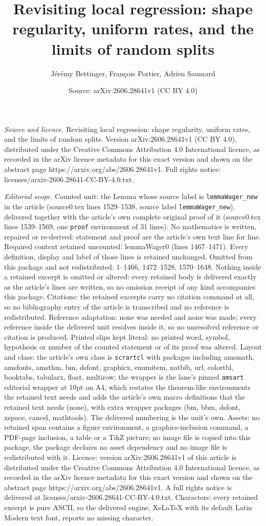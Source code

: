 \documentclass[10pt,a4paper]{amsart}
\title[Revisiting local regression: shape regularity, uniform rates]{Revisiting local regression: shape regularity, uniform rates, and the limits of random splits}
\author{J\'er\'emy Bettinger, Fran\c{c}ois Portier, Adrien Saumard}
\date{Source: arXiv:2606.28641v1 (CC BY 4.0)}
\begin{document}
\maketitle

\noindent\emph{Source and licence.} Revisiting local regression: shape regularity, uniform rates, and the limits of random splits. Version arXiv:2606.28641v1 (CC BY 4.0), distributed under the Creative Commons Attribution 4.0 International licence, as recorded in the arXiv licence metadata for this exact version and shown on the abstract page https://arxiv.org/abs/2606.28641v1. Full rights notice: licenses/arxiv-2606.28641-CC-BY-4.0.txt.\par\smallskip

\noindent\textit{Editorial scope.} Counted unit: the Lemma whose source label is \texttt{lemmaWager\_new} in the article (source0.tex lines 1529--1538, source label \texttt{lemmaWager\_new}), delivered together with the article's own complete original proof of it (source0.tex lines 1539--1569, one \texttt{proof} environment of 31 lines). No mathematics is written, repaired or re-derived: statement and proof are the article's own text line for line. Required context retained uncounted: lemmaWager0 (lines 1467--1471). Every definition, display and label of those lines is retained unchanged. Omitted from this package and not redistributed: 1--1466, 1472--1528, 1570--1648. Nothing inside a retained excerpt is omitted or altered: every retained body is delivered exactly as the article's lines are written, so no omission receipt of any kind accompanies this package. Citations: the retained excerpts carry no citation command at all, so no bibliography entry of the article is transcribed and no reference is redistributed. Reference adaptation: none was needed and none was made; every reference inside the delivered unit resolves inside it, so no unresolved reference or citation is produced. Printed slips kept literal: no printed word, symbol, hypothesis or number of the counted statement or of its proof was altered. Layout and class: the article's own class is \texttt{scrartcl} with packages including amsmath, amsfonts, amsthm, bm, dsfont, graphicx, enumitem, natbib, url, colortbl, booktabs, tabularx, float, multirow; the wrapper is the lane's pinned \texttt{amsart} editorial wrapper at 10pt on A4, which restates the theorem-like environments the retained text needs and adds the article's own macro definitions that the retained text needs (none), with extra wrapper packages (bm, bbm, dsfont, xspace, cancel, mathtools). The delivered numbering is the unit's own. Assets: no retained span contains a figure environment, a graphics-inclusion command, a PDF-page inclusion, a table or a TikZ picture; no image file is copied into this package, the package declares no asset dependency and no image file is redistributed with it. Licence: version arXiv:2606.28641v1 of this article is distributed under the Creative Commons Attribution 4.0 International licence, as recorded in the arXiv licence metadata for this exact version and shown on the abstract page https://arxiv.org/abs/2606.28641v1. A full rights notice is delivered at licenses/arxiv-2606.28641-CC-BY-4.0.txt. Characters: every retained excerpt is pure ASCII, so the delivered engine, XeLaTeX with its default Latin Modern text font, reports no missing character.
\end{document}
